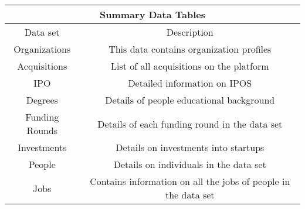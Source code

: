 \begin{table}[htbp]\centering
    \begin{tabular}{c c }
    \toprule
    \multicolumn{2}{c}{\textbf{Summary Data Tables}}  \\
    \midrule
    Data set            &    Description       \\
    \midrule
    Organizations       &    This data contains organization profiles             \\
    Acquisitions        &    List of all acquisitions on the platform        \\   
     IPO                &    Detailed information on IPOS                      \\
    Degrees             &    Details of people educational background          \\
    Funding Rounds      &    Details of each funding round in the data set                \\
    Investments         &    Details on investments into startups     \\
    People         &    Details on individuals in the data set     \\
    Jobs         &    Contains information on all the jobs of people in the data set \\

    \bottomrule
    \end{tabular}
\end{table}